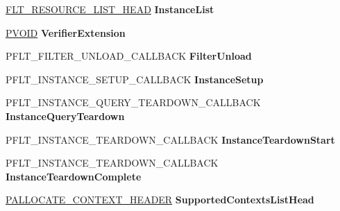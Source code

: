 \begin{DoxyCompactItemize}
\hyperlink{struct___f_l_t___r_e_s_o_u_r_c_e___l_i_s_t___h_e_a_d}{F\+L\+T\+\_\+\+R\+E\+S\+O\+U\+R\+C\+E\+\_\+\+L\+I\+S\+T\+\_\+\+H\+E\+AD} {\bfseries Instance\+List}
\item 
\mbox{\label{struct___f_l_t___f_i_l_t_e_r_a42a89db2d2458e7ee75a396cfaa8472c}} 
\hyperlink{interfacevoid}{P\+V\+O\+ID} {\bfseries Verifier\+Extension}
\item 
\mbox{\label{struct___f_l_t___f_i_l_t_e_r_a4d211ad1e492e422a8913daa593d357f}} 
P\+F\+L\+T\+\_\+\+F\+I\+L\+T\+E\+R\+\_\+\+U\+N\+L\+O\+A\+D\+\_\+\+C\+A\+L\+L\+B\+A\+CK {\bfseries Filter\+Unload}
\item 
\mbox{\label{struct___f_l_t___f_i_l_t_e_r_aabbf92141ef3eefc611433108d258b4c}} 
P\+F\+L\+T\+\_\+\+I\+N\+S\+T\+A\+N\+C\+E\+\_\+\+S\+E\+T\+U\+P\+\_\+\+C\+A\+L\+L\+B\+A\+CK {\bfseries Instance\+Setup}
\item 
\mbox{\label{struct___f_l_t___f_i_l_t_e_r_a0c0a010db8974a6f442c2f3bcb06fb11}} 
P\+F\+L\+T\+\_\+\+I\+N\+S\+T\+A\+N\+C\+E\+\_\+\+Q\+U\+E\+R\+Y\+\_\+\+T\+E\+A\+R\+D\+O\+W\+N\+\_\+\+C\+A\+L\+L\+B\+A\+CK {\bfseries Instance\+Query\+Teardown}
\item 
\mbox{\label{struct___f_l_t___f_i_l_t_e_r_ab407c683c3f8c63bf84af860cd182c61}} 
P\+F\+L\+T\+\_\+\+I\+N\+S\+T\+A\+N\+C\+E\+\_\+\+T\+E\+A\+R\+D\+O\+W\+N\+\_\+\+C\+A\+L\+L\+B\+A\+CK {\bfseries Instance\+Teardown\+Start}
\item 
\mbox{\label{struct___f_l_t___f_i_l_t_e_r_aad1beafca2234458beff0750389acec6}} 
P\+F\+L\+T\+\_\+\+I\+N\+S\+T\+A\+N\+C\+E\+\_\+\+T\+E\+A\+R\+D\+O\+W\+N\+\_\+\+C\+A\+L\+L\+B\+A\+CK {\bfseries Instance\+Teardown\+Complete}
\item 
\mbox{\label{struct___f_l_t___f_i_l_t_e_r_ab907fe067e7a8a6a91369772e32c67e3}} 
\hyperlink{struct___a_l_l_o_c_a_t_e___c_o_n_t_e_x_t___h_e_a_d_e_r}{P\+A\+L\+L\+O\+C\+A\+T\+E\+\_\+\+C\+O\+N\+T\+E\+X\+T\+\_\+\+H\+E\+A\+D\+ER} {\bfseries Supported\+Contexts\+List\+Head}
\item 
\mbox{\label{struct___f_l_t___f_i_l_t_e_r_ab86d45b0f03fd782a78ea0f14a08caf9}} 

\end{DoxyCompactItemize}
